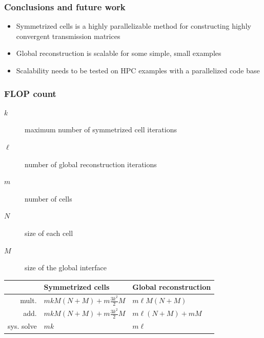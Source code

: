 \documentclass{beamer}
\begin{document}
\begin{frame}
\frametitle{Conclusions and future work}

\begin{itemize}
\item Symmetrized cells is a highly parallelizable method for constructing highly convergent transmission matrices
\item Global reconstruction is scalable for some simple, small examples
\item Scalability needs to be tested on HPC examples with a parallelized code base
\end{itemize}

\end{frame}

\begin{frame}
\frametitle{FLOP count}

\begin{description}
\item[$k$] maximum number of symmetrized cell iterations
\item[$\ell$] number of global reconstruction iterations
\item[$m$] number of cells
\item[$N$] size of each cell
\item[$M$] size of the global interface
\end{description}

\begin{tabular}{r | l l}
	& Symmetrized cells & Global reconstruction \\ \hline
	mult. & $mkM(N+M) + m\frac{3k^2}{2} M$ & $m \ell M (N+M)$ \\
	add. & $mkM(N+M) + m\frac{3k^2}{2} M$ & $m \ell (N+M) + mM$ \\
	sys. solve & $mk$ & $m \ell$
\end{tabular}

\end{frame}
\end{document}

